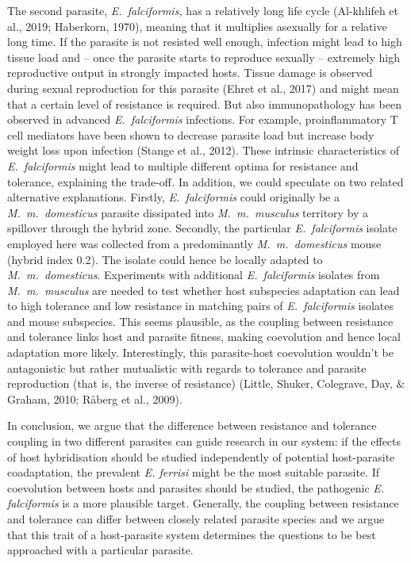 \documentclass[12pt]{article}
\renewcommand{\_}{\kern-1.5pt\textunderscore\kern-1.5pt}
\begin{document}
\textcolor[HTML]{FF0000}{The second parasite, \textit{E. falciformis,} has a relatively long life cycle (Al-khlifeh et al., 2019; Haberkorn, 1970), meaning that it multiplies asexually for a relative long time. If the parasite is not resisted well enough, infection might lead to high tissue load and – once the parasite starts to reproduce sexually – extremely high reproductive output in strongly impacted hosts. Tissue damage is observed during sexual reproduction for this parasite (Ehret et al., 2017) and might mean that a certain level of resistance is required. But also immunopathology has been observed in advanced \textit{E. falciformis} infections. For example, proinflammatory T cell mediators have been shown to decrease parasite load but increase body weight loss upon infection (Stange et al., 2012). These intrinsic characteristics of \textit{E. falciformis} might lead to multiple different optima for resistance and tolerance, explaining the trade-off\textit{. }In addition, we could speculate on two related alternative explanations}. Firstly, \textit{E. falciformis} could originally be a \textit{M. m. domesticus} parasite dissipated into \textit{M. m. musculus} territory by a spillover through the hybrid zone. Secondly, the particular \textit{E. falciformis} isolate employed here was collected from a predominantly \textit{M. m. domesticus} mouse (hybrid index 0.2). The isolate could hence be locally adapted to \textit{M. m. domesticus}. Experiments with additional \textit{E. falciformis} isolates from \textit{M. m. musculus} are needed to test whether host subspecies adaptation can lead to high tolerance and low resistance in matching pairs of \textit{E. falciformis} isolates and mouse subspecies. This seems plausible, as the coupling between resistance and tolerance links host and parasite fitness, making coevolution and hence local adaptation more likely. Interestingly, this parasite-host coevolution wouldn’t be antagonistic but rather mutualistic with regards to tolerance and parasite reproduction (that is, the inverse of resistance) (Little, Shuker, Colegrave, Day, $\&$  Graham, 2010; Råberg et al., 2009). \par

In conclusion, we argue that the difference between resistance and tolerance coupling in two different parasites can guide research in our system: if the effects of host hybridisation should be studied independently of potential host-parasite coadaptation, the prevalent \textit{E. ferrisi} might be the most suitable parasite. If coevolution between hosts and parasites should be studied, the pathogenic \textit{E. falciformis} is a more plausible target\textit{.} Generally, the coupling between resistance and tolerance can differ between closely related parasite species and we argue that this trait of a host-parasite system determines the questions to be best approached with a particular parasite. 
\end{document}
